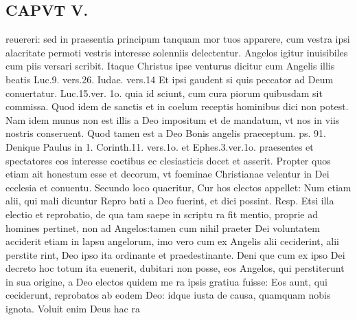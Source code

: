 \documentclass{article}
\begin{document}
\begin{pages}
\section*{CAPVT  V. }
\marginpar{[ p.333 ]}\pstart reuereri: sed in praesentia principum tanquam mor tuos apparere, cum vestra ipsi alacritate permoti vestris interesse solenniis delectentur. Angelos igitur inuisibiles cum piis versari scribit. Itaque Christus ipse venturus dicitur cum Angelis illis beatis Luc.9. vers.26. Iudae. vers.14 Et ipsi gaudent si quis peccator ad Deum conuertatur. Luc.15.ver. 1o. quia id sciunt, cum cura piorum quibusdam sit commissa. Quod idem de sanctis et in coelum receptis hominibus dici non potest. Nam idem munus non est illis a Deo impositum et de mandatum, vt nos in viis nostris conseruent. Quod tamen est a Deo Bonis angelis praeceptum. ps. 91. Denique Paulus in 1. Corinth.11. vers.1o. et Ephes.3.ver.1o. praesentes et spectatores eos interesse coetibus ec clesiasticis docet et asserit. Propter quos etiam ait honestum esse et decorum, vt foeminae Christianae velentur in Dei ecclesia et conuentu. Secundo loco quaeritur, Cur hos electos appellet: Num etiam alii, qui mali dicuntur Repro bati a Deo fuerint, et dici possint. Resp. Etsi illa electio et reprobatio, de qua tam saepe in scriptu ra fit mentio, proprie ad homines pertinet, non ad Angelos:tamen cum nihil praeter Dei voluntatem acciderit etiam in lapsu angelorum, imo vero cum ex Angelis alii ceciderint, alii perstite rint, Deo ipso ita ordinante et praedestinante. Deni que cum ex ipso Dei decreto hoc totum ita euenerit, dubitari non posse, eos Angelos, qui perstiterunt in sua origine, a Deo electos quidem me ra ipsis gratiua fuisse: Eos aunt, qui ceciderunt, reprobatos ab eodem Deo: idque iusta de causa, quamquam nobis ignota. Voluit enim Deus hac ra\pend

\end{pages}
\end{document}
